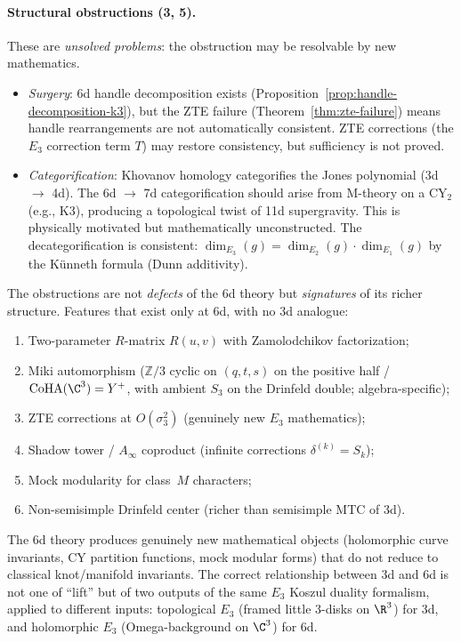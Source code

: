 \paragraph{Structural obstructions (3, 5).}
These are \emph{unsolved problems}: the obstruction may be resolvable by new mathematics.
\begin{itemize}
 \item \emph{Surgery}: 6d handle decomposition exists (Proposition~\ref{prop:handle-decomposition-k3}), but the ZTE failure (Theorem~\ref{thm:zte-failure}) means handle rearrangements are not automatically consistent. ZTE corrections (the $E_3$ correction term $T$) may restore consistency, but sufficiency is not proved.
 \item \emph{Categorification}: Khovanov homology categorifies the Jones polynomial (3d $\to$ 4d). The 6d $\to$ 7d categorification should arise from M-theory on a CY$_2$ (e.g., K3), producing a topological twist of 11d supergravity. This is physically motivated but mathematically unconstructed. The decategorification is consistent: $\dim_{E_3}(g) = \dim_{E_2}(g) \cdot \dim_{E_1}(g)$ by the K\"unneth formula (Dunn additivity).
\end{itemize}

\begin{remark}
\label{rem:irreducible-6d-content}
The obstructions are not \emph{defects} of the 6d theory but \emph{signatures} of its richer structure. Features that exist only at 6d, with no 3d analogue:
\begin{enumerate}[label=\textup{(\roman*)}]
 \item Two-parameter $R$-matrix $R(u, v)$ with Zamolodchikov factorization;
 \item Miki automorphism ($\mathbb{Z}/3$ cyclic on $(q, t, s)$ on the positive half / $\mathrm{CoHA}(\C^3) = Y^+$, with ambient $S_3$ on the Drinfeld double; algebra-specific);
 \item ZTE corrections at $O(\sigma_3^2)$ (genuinely new $E_3$ mathematics);
 \item Shadow tower / $A_\infty$ coproduct (infinite corrections $\delta^{(k)} = S_k$);
 \item Mock modularity for class~$M$ characters;
 \item Non-semisimple Drinfeld center (richer than semisimple MTC of 3d).
\end{enumerate}
The 6d theory produces genuinely new mathematical objects (holomorphic curve invariants, CY partition functions, mock modular forms) that do not reduce to classical knot/manifold invariants. The correct relationship between 3d and 6d is not one of ``lift'' but of two outputs of the same $E_3$ Koszul duality formalism, applied to different inputs: topological $E_3$ (framed little $3$-disks on $\R^3$) for 3d, and holomorphic $E_3$ (Omega-background on $\C^3$) for 6d.
\end{remark}

